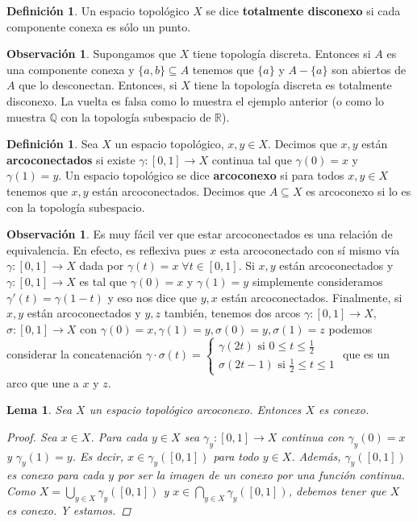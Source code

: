 \documentclass[12pt]{book}
\newtheorem{lem}[teo]{Lema}
\theoremstyle{definition}
\newtheorem{obs}[teo]{Observación}
\newtheorem{defn}[teo]{Definición}
\newcommand{\RR}{\mathbb{R}}      %
\newcommand{\QQ}{\mathbb{Q}}
\begin{document}
\begin{defn}
Un espacio topológico $X$ se dice \textbf{totalmente disconexo} si cada componente conexa es sólo un punto.
\end{defn}

\begin{obs}
Supongamos que $X$ tiene topología discreta. Entonces si $A$ es una componente conexa y $\{a,b\}\subseteq A$ tenemos que $\{a\}$ y $A-\{a\}$ son abiertos de $A$ que lo desconectan. Entonces, si $X$ tiene la topología discreta es totalmente disconexo. La vuelta es falsa como lo muestra el ejemplo anterior (o como lo muestra $\QQ$ con la topología subespacio de $\RR$).
\end{obs}

\begin{defn}
Sea $X$ un espacio topológico, $x,y\in X$. Decimos que $x,y$ están \textbf{arcoconectados} si existe $\gamma:[0,1]\to X$ continua tal que $\gamma(0)=x$ y $\gamma(1)=y$. Un espacio topológico se dice \textbf{arcoconexo} si para todos $x,y\in X$ tenemos que $x,y$ están arcoconectados. Decimos que $A\subseteq X$ es arcoconexo si lo es con la topología subespacio.
\end{defn}

\begin{obs}
Es muy fácil ver que estar arcoconectados es una relación de equivalencia. En efecto, es reflexiva pues $x$ esta arcoconectado con sí mismo vía $\gamma:[0,1]\to X$ dada por $\gamma(t)=x\;\forall t\in [0,1]$. Si $x,y$ están arcoconectados y $\gamma:[0,1]\to X$ es tal que $\gamma(0)=x$ y $\gamma(1)=y$ simplemente consideramos $\gamma'(t) = \gamma(1-t)$ y eso nos dice que $y,x$ están arcoconectados. Finalmente, si $x,y$ están arcoconectados y $y,z$ también, tenemos dos arcos $\gamma:[0,1]\to X$, $\sigma:[0,1]\to X$ con $\gamma(0)=x, \gamma(1)=y, \sigma(0)=y, \sigma(1)=z$ podemos considerar la concatenación $\gamma\cdot\sigma(t) = \begin{cases}\gamma(2t) \text{ si }0\leq t\leq \frac{1}{2} \\ \sigma(2t-1) \text{ si }\frac{1}{2}\leq t\leq 1\end{cases}$ que es un arco que une a $x$ y $z$.
\end{obs}

\begin{lem}
Sea $X$ un espacio topológico arcoconexo. Entonces $X$ es conexo.
\begin{proof}
Sea $x\in X$. Para cada $y\in X$ sea $\gamma_y:[0,1]\to X$ continua con $\gamma_y(0)=x$ y $\gamma_y(1)=y$. Es decir, $x\in\gamma_y([0,1])$ para todo $y\in X$. Además, $\gamma_y([0,1])$ es conexo para cada $y$ por ser la imagen de un conexo por una función continua. Como $X=\displaystyle\bigcup_{y\in X}\gamma_y([0,1])$ y $x\in\displaystyle\bigcap_{y\in X}\gamma_y([0,1])$, debemos tener que $X$ es conexo. Y estamos.
\end{proof}
\end{lem}
\end{document}
